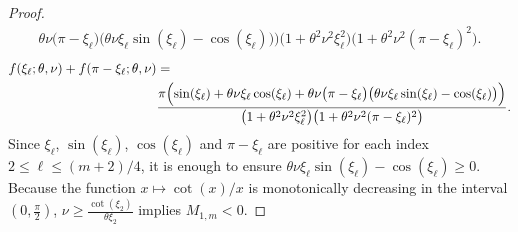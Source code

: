 \documentclass[smallextended,numbook,runningheads]{svjour3}     %
\newcommand{\Mod}[1]{\ (\mathrm{mod}\ #1)}
\begin{document}
\begin{description}[style=unboxed,leftmargin=0cm]
\begin{proof}
\begin{align*}
{				\theta\nu\bigl(\pi-\xi_\ell\bigr)\bigl(\theta\nu\xi_\ell\sin(\xi_\ell)-\cos(\xi_\ell)\bigr)\Bigr)}
					{\bigl(1+\theta^2\nu^2\xi^2_\ell\bigr)\bigl(1+\theta^2\nu^2(\pi-\xi_\ell)^2\bigr)}.
		\end{align*}
	\else
		\begin{align*}
			f(\xi_\ell; \theta, \nu) + f(\pi-\xi_\ell; \theta, \nu) &= \\
				&\frac{\pi\Bigl(\sin(\xi_\ell) + \theta\nu\xi_\ell\cos(\xi_\ell) +
				\theta\nu\bigl(\pi-\xi_\ell\bigr)\bigl(\theta\nu\xi_\ell\sin(\xi_\ell)-\cos(\xi_\ell)\bigr)\Bigr)}
					{\bigl(1+\theta^2\nu^2\xi^2_\ell\bigr)\bigl(1+\theta^2\nu^2(\pi-\xi_\ell)^2\bigr)}.
		\end{align*}
	\fi
	Since $\xi_\ell$, $\sin(\xi_\ell)$, $\cos(\xi_\ell)$ and $\pi-\xi_\ell$ are positive for each index $2 \le \ell \le (m+2)/4$,
	it is enough to ensure $\theta\nu\xi_\ell\sin(\xi_\ell)-\cos(\xi_\ell) \ge 0$.
	Because the function $x\mapsto\cot(x)/x$ is monotonically decreasing in the interval $(0,\frac{\pi}{2})$, 
	$\nu \ge \frac{\cot(\xi_2)}{\theta \xi_2}$ implies $M_{1,m}<0$.

\end{proof}
\end{description}
\end{document}
